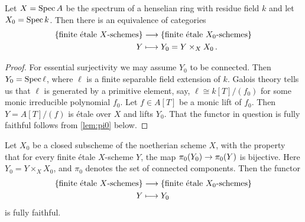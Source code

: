 \begin{prop}\label{prop:pi1Henselian}
	Let $X=\operatorname{Spec} A$ be the spectrum of a henselian ring with residue field $k$ and let $X_0=\operatorname{Spec} k$. Then there is an equivalence of categories
	\begin{align*}
		\left\{\text{finite étale $X$-schemes}\right\}&\morphism \left\{\text{finite étale $X_0$-schemes}\right\}\\
		Y&\longmapsto Y_0=Y\times_XX_0\,.
	\end{align*}
\end{prop}
\begin{proof}
	For essential surjectivity we may assume $Y_0$ to be connected. Then $Y_0=\operatorname{Spec} \ell$, where $\ell$ is a finite separable field extension of $k$. Galois theory tells us that $\ell$ is generated by a primitive element, say, $\ell\cong k[T]/(f_0)$ for some monic irreducible polynomial $f_0$. Let $f\in A[T]$ be a monic lift of $f_0$. Then $Y=A[T]/(f)$ is étale over $X$ and lifts $Y_0$. 
	That the functor in question is fully faithful follows from \cref{lem:pi0} below.
\end{proof}
\begin{lem}\label{lem:pi0}
	Let $X_0$ be a closed subscheme of the noetherian scheme $X$, with the property that for every finite étale $X$-scheme $Y$, the map $\pi_0(Y_0)\morphism \pi_0(Y)$ is bijective. Here $Y_0=Y\times_XX_0$, and $\pi_0$ denotes the set of connected components. Then the functor
	\begin{align*}
		\left\{\text{finite étale $X$-schemes}\right\}&\morphism \left\{\text{finite étale $X_0$-schemes}\right\}\\
		Y&\longmapsto Y_0
	\end{align*}
	is fully faithful.
\end{lem}
